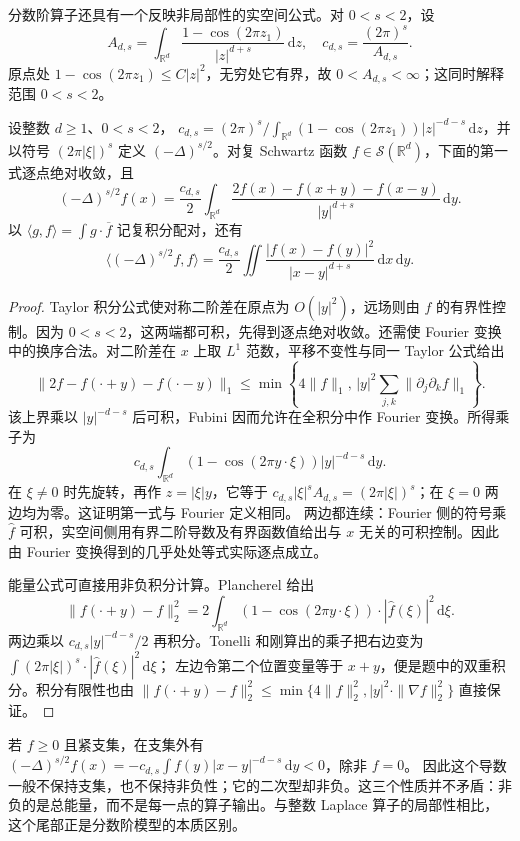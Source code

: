分数阶算子还具有一个反映非局部性的实空间公式。对 \(0<s<2\)，设
\[
 A_{d,s}=\int_{\mathbb R^d}\frac{1-\cos(2\pi z_1)}{|z|^{d+s}}\,\mathrm dz,
 \quad c_{d,s}=\frac{(2\pi)^s}{A_{d,s}}.
\]
原点处 \(1-\cos(2\pi z_1)\leq C|z|^2\)，无穷处它有界，故 \(0<A_{d,s}<\infty\)；这同时解释范围 \(0<s<2\)。
\begin{proposition}\label{b2:prop:22-fractional-kernel}
设整数 \(d\geq1\)、\(0<s<2\)，
\(c_{d,s}=(2\pi)^s/\int_{\mathbb R^d}(1-\cos(2\pi z_1))|z|^{-d-s}\,\mathrm dz\)，并以符号 \((2\pi|\xi|)^s\) 定义 \((-\Delta)^{s/2}\)。对复 Schwartz 函数 \(f\in\mathcal S(\mathbb R^d)\)，下面的第一式逐点绝对收敛，且
\[
 (-\Delta)^{s/2}f(x)=\frac{c_{d,s}}2
 \int_{\mathbb R^d}\frac{2f(x)-f(x+y)-f(x-y)}{|y|^{d+s}}\,\mathrm dy.
\]
以 \(\langle g,f\rangle=\int g\cdot\overline f\) 记复积分配对，还有
\[
 \langle(-\Delta)^{s/2}f,f\rangle
 =\frac{c_{d,s}}2
 \iint\frac{|f(x)-f(y)|^2}{|x-y|^{d+s}}\,\mathrm dx\,\mathrm dy.
\]
\end{proposition}
\begin{proof}
Taylor 积分公式使对称二阶差在原点为 \(O(|y|^2)\)，远场则由 \(f\) 的有界性控制。因为 \(0<s<2\)，这两端都可积，先得到逐点绝对收敛。还需使 Fourier 变换中的换序合法。对二阶差在 \(x\) 上取 \(L^1\) 范数，平移不变性与同一 Taylor 公式给出
\[
 \|2f-f(\cdot+y)-f(\cdot-y)\|_1
 \leq\min\left\{4\|f\|_1,\,
             |y|^2\sum_{j,k}\|\partial_j\partial_k f\|_1\right\}.
\]
该上界乘以 \(|y|^{-d-s}\) 后可积，Fubini 因而允许在全积分中作 Fourier 变换。所得乘子为
\[
 c_{d,s}\int_{\mathbb R^d}
       (1-\cos(2\pi y\cdot\xi))|y|^{-d-s}\,\mathrm dy.
\]
在 \(\xi\ne0\) 时先旋转，再作 \(z=|\xi|y\)，它等于
\(c_{d,s}|\xi|^s A_{d,s}=(2\pi|\xi|)^s\)；在 \(\xi=0\) 两边均为零。这证明第一式与 Fourier 定义相同。
两边都连续：Fourier 侧的符号乘 \(\widehat f\) 可积，实空间侧用有界二阶导数及有界函数值给出与 \(x\) 无关的可积控制。因此由 Fourier 变换得到的几乎处处等式实际逐点成立。

能量公式可直接用非负积分计算。Plancherel 给出
\[
 \|f(\cdot+y)-f\|_2^2
 =2\int_{\mathbb R^d}
        (1-\cos(2\pi y\cdot\xi))\cdot|\widehat f(\xi)|^2\,\mathrm d\xi.
\]
两边乘以 \(c_{d,s}|y|^{-d-s}/2\) 再积分。Tonelli 和刚算出的乘子把右边变为
\(\int(2\pi|\xi|)^s\cdot|\widehat f(\xi)|^2\,\mathrm d\xi\)；
左边令第二个位置变量等于 \(x+y\)，便是题中的双重积分。积分有限性也由
\(\|f(\cdot+y)-f\|_2^2\leq
\min\{4\|f\|_2^2,|y|^2\cdot\|\nabla f\|_2^2\}\)
直接保证。
\end{proof}
若 \(f\geq0\) 且紧支集，在支集外有
\((-\Delta)^{s/2}f(x)=-c_{d,s}\int f(y)|x-y|^{-d-s}\,\mathrm dy<0\)，除非 \(f=0\)。
因此这个导数一般不保持支集，也不保持非负性；它的二次型却非负。这三个性质并不矛盾：非负的是总能量，而不是每一点的算子输出。与整数 Laplace 算子的局部性相比，这个尾部正是分数阶模型的本质区别。

